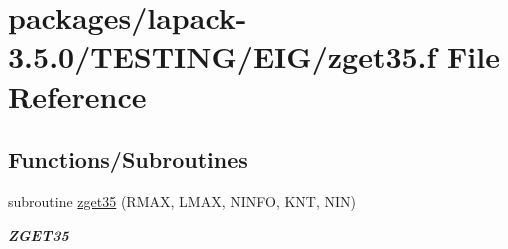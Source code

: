 \hypertarget{zget35_8f}{}\section{packages/lapack-\/3.5.0/\+T\+E\+S\+T\+I\+N\+G/\+E\+I\+G/zget35.f File Reference}
\label{zget35_8f}
\subsection*{Functions/\+Subroutines}
\begin{DoxyCompactItemize}
\item 
subroutine \hyperlink{group__complex16__eig_ga06b79b13bd73f94f9dd9091c656edf38}{zget35} (R\+M\+A\+X, L\+M\+A\+X, N\+I\+N\+F\+O, K\+N\+T, N\+I\+N)
\begin{DoxyCompactList}\small\item\em {\bfseries Z\+G\+E\+T35} \end{DoxyCompactList}\end{DoxyCompactItemize}
